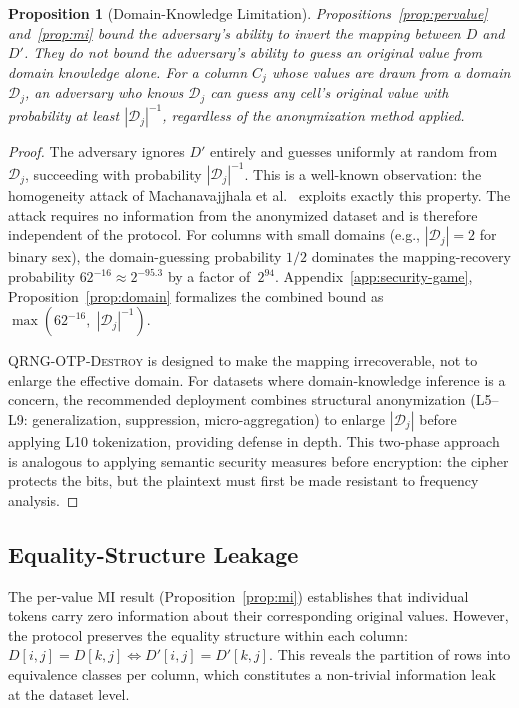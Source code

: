\documentclass[journal]{IEEEtran}
\newtheorem{proposition}[theorem]{Proposition}
\begin{document}
\begin{proposition}[Domain-Knowledge Limitation]
\label{prop:domainlimit}
Propositions~\ref{prop:pervalue} and~\ref{prop:mi} bound the adversary's ability to invert the \emph{mapping} between $D$ and $D'$. They do not bound the adversary's ability to guess an original value from domain knowledge alone. For a column $C_j$ whose values are drawn from a domain $\mathcal{D}_j$, an adversary who knows $\mathcal{D}_j$ can guess any cell's original value with probability at least $|\mathcal{D}_j|^{-1}$, regardless of the anonymization method applied.
\end{proposition}

\begin{proof}
The adversary ignores $D'$ entirely and guesses uniformly at random from $\mathcal{D}_j$, succeeding with probability $|\mathcal{D}_j|^{-1}$. This is a well-known observation: the homogeneity attack of Machanavajjhala et al.~\cite{machanavajjhala2007ldiv} exploits exactly this property. The attack requires no information from the anonymized dataset and is therefore independent of the protocol. For columns with small domains (e.g., $|\mathcal{D}_j| = 2$ for binary sex), the domain-guessing probability $1/2$ dominates the mapping-recovery probability $62^{-16} \approx 2^{-95.3}$ by a factor of~$2^{94}$. Appendix~\ref{app:security-game}, Proposition~\ref{prop:domain} formalizes the combined bound as $\max(62^{-16},\; |\mathcal{D}_j|^{-1})$.

\medskip\noindent
\textsc{QRNG-OTP-Destroy} is designed to make the mapping irrecoverable, not to enlarge the effective domain. For datasets where domain-knowledge inference is a concern, the recommended deployment combines structural anonymization (L5--L9: generalization, suppression, micro-aggregation) to enlarge $|\mathcal{D}_j|$ before applying L10 tokenization, providing defense in depth. This two-phase approach is analogous to applying semantic security measures before encryption: the cipher protects the bits, but the plaintext must first be made resistant to frequency analysis.
\end{proof}

\subsection{Equality-Structure Leakage}
\label{subsec:equality}

The per-value MI result (Proposition~\ref{prop:mi}) establishes that individual tokens carry zero information about their corresponding original values. However, the protocol preserves the equality structure within each column: $D[i,j] = D[k,j] \iff D'[i,j] = D'[k,j]$. This reveals the partition of rows into equivalence classes per column, which constitutes a non-trivial information leak at the dataset level.
\end{document}
